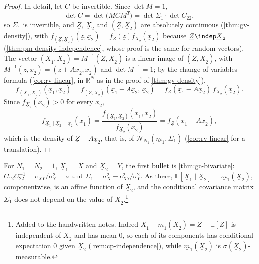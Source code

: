 \begin{proof}
In detail, let $C$ be invertible. Since $\det M=1$,
\[
  \det C=\det\big(MCM^T\big)=\det\Sigma_1\cdot\det C_{22},
\]
so $\Sigma_1$ is invertible, and $\underline Z$, $\underline X_2$ and $(\underline Z,\underline X_2)$ are absolutely continuous
(\cref{thm:gv-density}), with $f_{(\underline Z,\underline X_2)}(\underline z,\underline x_2)=f_{\underline Z}(\underline z)f_{\underline X_2}(\underline x_2)$ because $\underline Z\indep\underline X_2$
(\cref{thm:pm-density-independence}, whose proof is the same for random vectors). The vector
$(\underline X_1,\underline X_2)=M^{-1}(\underline Z,\underline X_2)$ is a linear image of $(\underline Z,\underline X_2)$, with
$M^{-1}(\underline z,\underline x_2)=(\underline z+A\underline x_2,\underline x_2)$ and $\det M^{-1}=1$; by the change of variables formula
(\cref{cor:rv-linear}, in $\mathbb R^N$ as in the proof of \cref{thm:gv-density}),
\[
  f_{(\underline X_1,\underline X_2)}(\underline x_1,\underline x_2)=f_{(\underline Z,\underline X_2)}(\underline x_1-A\underline x_2,\,\underline x_2)=f_{\underline Z}(\underline x_1-A\underline x_2)\,f_{\underline X_2}(\underline x_2).
\]
Since $f_{\underline X_2}(\underline x_2)>0$ for every $\underline x_2$,
\[
  f_{\underline X_1\mid\underline X_2=\underline x_2}(\underline x_1)=\frac{f_{(\underline X_1,\underline X_2)}(\underline x_1,\underline x_2)}{f_{\underline X_2}(\underline x_2)}=f_{\underline Z}(\underline x_1-A\underline x_2),
\]
which is the density of $\underline Z+A\underline x_2$, that is, of $\mathcal N_{N_1}(\underline m_1,\Sigma_1)$ (\cref{cor:rv-linear}
for a translation).
\end{proof}

For $N_1=N_2=1$, $\underline X_1=X$ and $\underline X_2=Y$, the first bullet is \cref{thm:gc-bivariate}:
$C_{12}C_{22}^{-1}=c_{XY}/\sigma_Y^2=a$ and $\Sigma_1=\sigma_X^2-c_{XY}^2/\sigma_Y^2$. As there,
$\mathbb E[\underline X_1\mid\underline X_2]=\underline m_1(\underline X_2)$, componentwise, is an affine function
of $\underline X_2$, and the conditional covariance matrix $\Sigma_1$ does not depend on the value of
$\underline X_2$.\footnote{Added to the handwritten notes. Indeed
$\underline X_1-\underline m_1(\underline X_2)=\underline Z-\mathbb E[\underline Z]$ is independent of
$\underline X_2$ and has mean $\underline 0$, so each of its components has conditional expectation $0$
given $\underline X_2$ (\cref{rem:cp-independence}), while $\underline m_1(\underline X_2)$ is
$\sigma(\underline X_2)$-measurable.}


